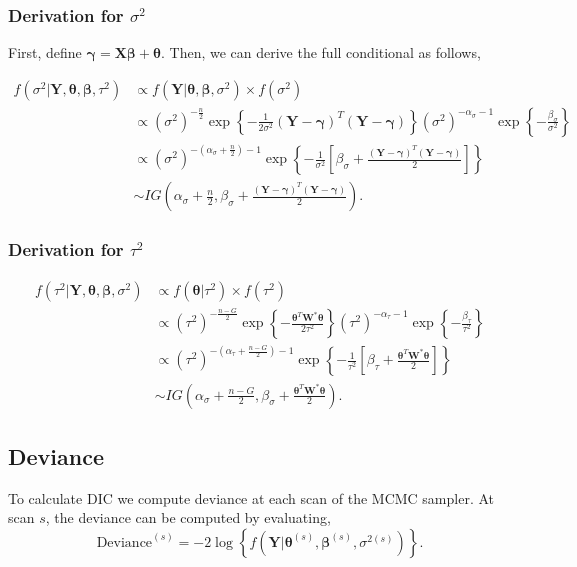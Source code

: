 \documentclass[12pt]{article} %
\theoremstyle{plain}
\theoremstyle{definition}
\theoremstyle{remark}
\begin{document}
\subsubsection*{Derivation for $\sigma^2$}

First, define $\boldsymbol{\gamma}=\mathbf{X}\boldsymbol{\beta}+\boldsymbol{\theta}$. Then, we can derive the full conditional as follows,

\begin{align*}
f\left(\sigma^2|\mathbf{Y},\boldsymbol{\theta},\boldsymbol{\beta},\tau^2\right) &\propto f\left(\mathbf{Y}|\boldsymbol{\theta},\boldsymbol{\beta},\sigma^2\right) \times f\left(\sigma^2\right)\\
&\propto \left(\sigma^2\right)^{-\frac{n}{2}}\exp\left\{-\frac{1}{2\sigma^2}\left(\mathbf{Y}-\boldsymbol{\gamma}\right)^T\left(\mathbf{Y}-\boldsymbol{\gamma}\right)\right\} \left(\sigma^2\right)^{-\alpha_{\sigma}-1} \exp\left\{-\frac{\beta_{\sigma}}{\sigma^2}\right\}\\
&\propto \left(\sigma^2\right)^{-\left(\alpha_{\sigma}+\frac{n}{2}\right)-1}\exp\left\{-\frac{1}{\sigma^2}\left[\beta_{\sigma}+\frac{\left(\mathbf{Y}-\boldsymbol{\gamma}\right)^T\left(\mathbf{Y}-\boldsymbol{\gamma}\right)}{2}\right]\right\}\\
&\sim IG\left(\alpha_{\sigma}+\frac{n}{2},\beta_{\sigma}+\frac{\left(\mathbf{Y}-\boldsymbol{\gamma}\right)^T\left(\mathbf{Y}-\boldsymbol{\gamma}\right)}{2}\right).
\end{align*}

\subsubsection*{Derivation for $\tau^2$}

\begin{align*}
f\left(\tau^2|\mathbf{Y},\boldsymbol{\theta},\boldsymbol{\beta},\sigma^2\right) &\propto f\left(\boldsymbol{\theta}|\tau^2\right) \times f\left(\tau^2\right)\\
&\propto \left(\tau^2\right)^{-\frac{n-G}{2}}\exp\left\{-\frac{\boldsymbol{\theta}^T \mathbf{W}^*\boldsymbol{\theta}}{2\tau^2}\right\} \left(\tau^2\right)^{-\alpha_{\tau}-1} \exp\left\{-\frac{\beta_{\tau}}{\tau^2}\right\}\\
&\propto \left(\tau^2\right)^{-\left(\alpha_{\tau}+\frac{n-G}{2}\right)-1}\exp\left\{-\frac{1}{\tau^2}\left[\beta_{\tau}+\frac{\boldsymbol{\theta}^T \mathbf{W}^*\boldsymbol{\theta}}{2}\right]\right\}\\
&\sim IG\left(\alpha_{\sigma}+\frac{n-G}{2},\beta_{\sigma}+\frac{\boldsymbol{\theta}^T \mathbf{W}^*\boldsymbol{\theta}}{2}\right).
\end{align*}

\subsection*{Deviance}

To calculate DIC we compute deviance at each scan of the MCMC sampler. At scan $s$, the deviance can be computed by evaluating, 
$$\text{Deviance}^{(s)}=-2\log\left\{f\left(\mathbf{Y}\Big|\boldsymbol{\theta}^{(s)},\boldsymbol{\beta}^{(s)},\sigma^{2(s)}\right)\right\}.$$
\end{document}
